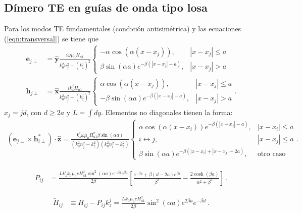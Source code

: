 \subsection{Dímero TE en guías de onda tipo losa}
Para los modos TE fundamentales (condición antisimétrica) y las ecuaciones (\ref{eqn:transversal}) se tiene que
\begin{align}
	\textbf{e}_{j\perp} &= \hat{\textbf{y}}\frac{i\omega\mu_0 H_{a1}}{k_0^2n_j^2 - (k_z^j)^2}\left\{ \begin{matrix}
-\alpha \cos(\alpha (x-x_j)), &|x-x_j|\le a
\\
\beta\sin(\alpha a) e^{-\beta(|x-x_j|-a)}, &|x-x_j| > a
\end{matrix}\right.
\\
\textbf{h}_{j\perp} &= \hat{\textbf{x}}\frac{ik_z^j H_{a1}}{k_0^2n_j^2 - (k_z^j)^2}\left\{ \begin{matrix}
\alpha \cos(\alpha (x-x_j)), &|x-x_j|\le a
\\
-\beta\sin(\alpha a) e^{-\beta(|x-x_j|-a)}, &|x-x_j| > a
\end{matrix}\right. .
\end{align}
$x_j=jd$, con $d\ge 2a$ y $L=\int dy$. Elementos no diagonales tienen la forma:
\begin{align}
	\left(\textbf{e}_{j\perp}\times\textbf{h}_{i\perp}^*\right)\cdot \hat{\textbf{z}}
	=
	\frac{k_z^i \omega \mu_0 H_{a1}^2 \beta\sin(\alpha a)}{(k_0^2n_j^2 - k_z^2)(k_0^2n_i^2 - k_z^2)}
	\left\{
	\begin{matrix}
		 \alpha\cos(\alpha(x-x_i))e^{-\beta(|x-x_j|-a)}, & |x-x_i| \le a
		\\
		i \leftrightarrow j, & |x-x_j| \le a
		\\
		\beta \sin(\alpha a)e^{-\beta (|x-x_i|+|x-x_j|-2a)}, & \text{otro caso}
	\end{matrix}
	\right. .
\end{align}

\begin{align*}
	P_{ij} &= \frac{L k_z^i k_0  \mu_0 c H_{a1}^2 \sin^2(\alpha a)e^{-\beta d}e^{\beta a}}{2\beta} \left[\frac{e^{-\beta a} + \beta (d-2a)e^{\beta a}}{\beta^2} - \frac{2\cosh(\beta a)}{\alpha^2+\beta^2} \right] \ .
\end{align*}

\begin{align*}
	\tilde{H}_{ij} &\equiv H_{ij} - P_{ij} k_z^j = \frac{L k_0    \mu_0 c H_{a1}^2 }{2 \beta }  \sin^2(\alpha a)e^{2\beta a} e^{-\beta d} \ .
\end{align*}

